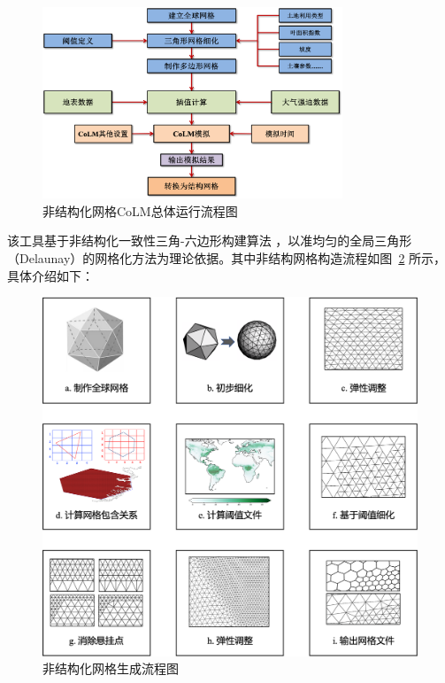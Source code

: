 {
  \begin{figure}[htbp]
    \centering
    \includegraphics[width=0.8\textwidth]{Figures/模式构架/非结构化网格CoLM总体运行流程图.png}
    \caption{非结构化网格CoLM总体运行流程图}
    \label{fig:非结构化网格CoLM总体运行流程图}
  \end{figure}
}

该工具基于非结构化一致性三角-六边形构建算法 \citep{fatichi2020soil,walko2008ocean,walko_direct_2011}，以准均匀的全局三角形（Delaunay）的网格化方法为理论依据。其中非结构网格构造流程如图~\ref{fig:非结构化网格生成流程图} 所示，具体介绍如下：
{
  \begin{figure}[htbp]
    \centering
    \includegraphics[width=\textwidth]{Figures/模式构架/非结构化网格生成流程图.png}
    \caption{非结构化网格生成流程图}
    \label{fig:非结构化网格生成流程图}
  \end{figure}
}

